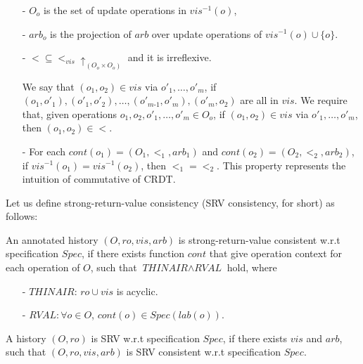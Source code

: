 \begin{itemize}
\setlength{\itemsep}{0.5pt}
\item[-] $O_o$ is the set of update operations in $\mathit{vis}^{-1}(o)$, 

\item[-] {\color {red}$arb_o$ is the projection of $arb$ over update operations of $\mathit{vis}^{-1}(o) \cup \{ o \}$. } 

\item[-] $< \subseteq <_{\mathit{vis}} \uparrow_{(O_o \times O_o)}$ and it is irreflexive. 

We say that $(o_1,o_2) \in \mathit{vis}$ via $o'_1,\ldots,o'_m$, if $(o_1,o'_1),(o'_1,o'_2),\ldots,(o'_{\textit{m-1}},o'_m),(o'_m,o_2)$ are all in $\mathit{vis}$. We require that, {\color {red}given operations $o_1,o_2,o'_1,\ldots,o'_m \in O_o$, if $(o_1,o_2) \in \mathit{vis}$ via $o'_1,\ldots,o'_m$, then $(o_1,o_2) \in <$.} 

\item[-] For each $cont(o_1)=(O_1,<_1,arb_1)$ and $cont(o_2)=(O_2,<_2,arb_2)$, {\color {red}if $\mathit{vis}^{-1}(o_1) = \mathit{vis}^{-1}(o_2)$, then $<_1 = <_2$.} This property represents the intuition of commutative of CRDT. 
\end{itemize} 

Let us define strong-return-value consistency (SRV consistency, for short) as follows:


\begin{definition}
\label{definition:strong return value consistency} 
An annotated history $(O,\mathit{ro},\mathit{vis},\mathit{arb})$ is strong-return-value consistent w.r.t specification $Spec$, if there exists function $cont$ that give operation context for each operation of $O$, such that $\textit{THINAIR} \wedge \textit{RVAL}$ hold, where

\begin{itemize}
\setlength{\itemsep}{0.5pt}
\item[-] $\textit{THINAIR}$: $\mathit{ro} \cup \mathit{vis}$ is acyclic.

\item[-] $\textit{RVAL}: \forall o \in O$, $cont(o) \in Spec(lab(o))$. 
\end{itemize} 

A history $(O,\mathit{ro})$ is SRV w.r.t specification $Spec$, if there exists $\mathit{vis}$ and $\mathit{arb}$, such that $(O,\mathit{ro},\mathit{vis},\mathit{arb})$ is SRV consistent w.r.t specification $Spec$. 
\end{definition}


